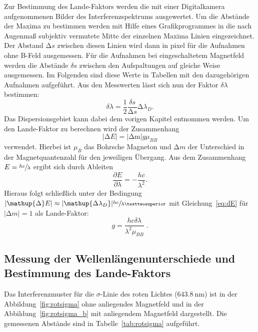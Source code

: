 Zur Bestimmung des Lande-Faktors werden die mit einer Digitalkamera aufgenommenen Bilder des Interferenzspektrums ausgewertet. Um die Abstände der Maxima zu bestimmen werden mit Hilfe eines Grafikprogrammes in die nach Augenmaß subjektiv vermutete Mitte der einzelnen Maxima Linien eingezeichnet. Der Abstand $\mathup{\Delta} s$ zwischen diesen Linien wird dann in pixel für die Aufnahmen ohne B-Feld ausgemessen. Für die Aufnahmen bei eingeschaltetem Magnetfeld werden die Abstände $\delta s$ zwischen den Aufspaltungen auf gleiche Weise ausgemessen. Im Folgenden sind diese Werte in Tabellen mit den dazugehörigen Aufnahmen aufgeführt. Aus den Messwerten lässt sich nun der Faktor $\delta\lambda$ bestimmen:
%
\begin{equation}
  \delta\lambda=\frac{1}{2}\frac{\delta s}{\mathup{\Delta} s}\mathup{\Delta}\lambda_D.
  \label{eq:dlambda}
\end{equation}
%
Das Dispersionsgebiet kann dabei dem vorigen Kapitel entnommen werden. Um den Lande-Faktor zu berechnen wird der Zusammenhang
%
\begin{equation}
    |\mathup{\Delta}E|=|\mathup{\Delta m}|g\mu_{BB}
  \label{eq:dE}
\end{equation}
%
verwendet. Hierbei ist $\mu_B$ das Bohrsche Magneton und $\mathup{\Delta}m$ der Unterschied in der Magnetquantenzahl für den jeweiligen Übergang. Aus dem Zusammenhang $E=\sfrac{hc}{\lambda}$ ergibt sich durch Ableiten
%
\begin{equation}
  \frac{\partial E}{\partial\lambda}=-\frac{hc}{\lambda^2}.
  \label{eq:partE}
\end{equation}
%
Hieraus folgt schließlich unter der Bedingung $|\mathup{\Delta}E|\approx|\mathup{\Delta\lambda_D}|\sfrac{hc}{\lambda²}$ mit Gleichung~\eqref{eq:dE} für $|\mathup{\Delta}m|=1$ als Lande-Faktor:
%
\begin{equation}
    g=\frac{hc\delta\lambda}{\lambda^2\mu_{BB}}\; .
  \label{eq:lande}
\end{equation}

\subsection{Messung der Wellenlängenunterschiede und Bestimmung des Lande-Faktors}

Das Interferenzmuster für die $\sigma$-Linie des roten Lichtes ($\SI{643,8}{\nano\meter}$) ist in der Abbildung~\ref{fig:rotsigma} ohne anliegendes Magnetfeld und in der Abbildung~\ref{fig:rotsigma_b} mit anliegendem Magnetfeld dargestellt. Die gemessenen Abstände sind in Tabelle~\ref{tab:rotsigma} aufgeführt.

